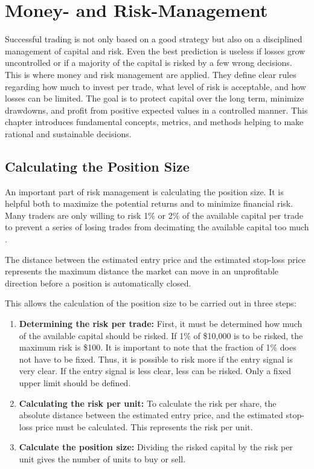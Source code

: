 \section{Money- and Risk-Management}
\label{chap:risk-man}

Successful trading is not only based on a good strategy but also on a disciplined management of capital and risk.
Even the best prediction is useless if losses grow uncontrolled or if a majority of the capital is risked by a few wrong decisions.
This is where money and risk management are applied.
They define clear rules regarding how much to invest per trade, what level of risk is acceptable, and how losses can be limited.
The goal is to protect capital over the long term, minimize drawdowns, and profit from positive expected values in a controlled manner.
This chapter introduces fundamental concepts, metrics, and methods helping to make rational and sustainable decisions.

\subsection{Calculating the Position Size}

An important part of risk management is calculating the position size.
It is helpful both to maximize the potential returns and to minimize financial risk.
Many traders are only willing to risk 1\% or 2\% of the available capital per trade to prevent a series of losing trades from decimating the available capital too much \cite{1-2-prozent}.

The distance between the estimated entry price and the estimated stop-loss price represents the maximum distance the market can move in an unprofitable direction before a position is automatically closed.

This allows the calculation of the position size to be carried out in three steps:

\begin{enumerate}
    \item \textbf{Determining the risk per trade:} First, it must be determined how much of the available capital should be risked.
    If 1\% of \$10,000 is to be risked, the maximum risk is \$100.
    It is important to note that the fraction of 1\% does not have to be fixed.
    Thus, it is possible to risk more if the entry signal is very clear.
    If the entry signal is less clear, less can be risked.
    Only a fixed upper limit should be defined.
    \item \textbf{Calculating the risk per unit:} To calculate the risk per share, the absolute distance between the estimated entry price, and the estimated stop-loss price must be calculated.
    This represents the risk per unit.
    \item \textbf{Calculate the position size:} Dividing the risked capital by the risk per unit gives the number of units to buy or sell.
\end{enumerate}

